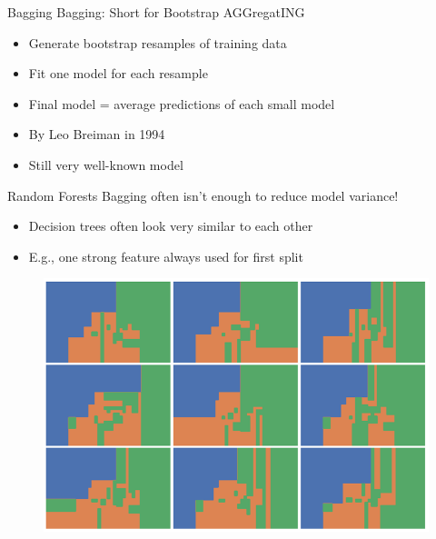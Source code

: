 \documentclass[aspectratio=169]{../latex_main/tntbeamer}  %
\begin{document}
	
	
	\begin{frame}[c]{Bagging}
	    Bagging: Short for Bootstrap AGGregatING
	    \begin{itemize}
	        \item Generate bootstrap resamples of training data
	        \item Fit one model for each resample
	        \item Final model = average predictions of each small model
	        \item By Leo Breiman in 1994
	        \item Still very well-known model
	    \end{itemize}

	\end{frame}
	
	\begin{frame}[c]{Random Forests}
	    Bagging often isn’t enough to reduce model variance!
	    \begin{itemize}
	        \item Decision trees often look very similar to each other
	        \item E.g., one strong feature always used for first split
	    \end{itemize}
	    
	    \begin{figure}
	        \centering
	        \includegraphics[scale=.4]{Bild57}
	    \end{figure}
	\end{frame}
	
\end{document}
